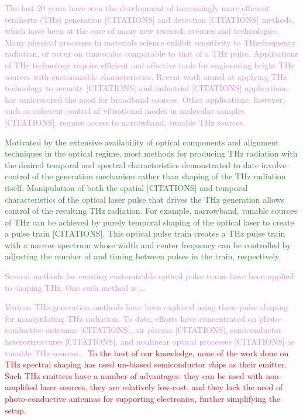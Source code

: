 \documentclass[12pt]{article}
\begin{document}
\begin{em}
  \textcolor{violet}{The last 20 years have seen the development of
    increasingly more efficient terahertz (THz) generation [CITATIONS]
    and detection [CITATIONS] methods, which have been at the core of
    many new research avenues and technologies. Many physical
    processes in materials science exhibit sensitivity to
    THz-frequency radiation, or occur on timescales comparable to that
    of a THz pulse. Applications of THz technology require efficient
    and effective tools for engineering bright THz sources with
    customizable characteristics. Recent work aimed at applying THz
    technology to security [CITATIONS] and industrial [CITATIONS]
    applications has underscored the need for broadband sources. Other
    applications, however, such as coherent control of vibrational
    modes in molecular samples [CITATIONS], require access to
    narrowband, tunable THz sources.}

  \textcolor{ForestGreen}{Motivated by the extensive availability of
    optical components and alignment techniques in the optical regime,
    most methods for producing THz radiation with the desired temporal
    and spectral characteristics demonstrated to date involve control
    of the generation mechanism rather than shaping of the THz
    radiation itself. Manipulation of both the spatial [CITATIONS] and
    temporal characteristics of the optical laser pulse that drives
    the THz generation allows control of the resulting THz
    radiation. For example, narrowband, tunable sources of THz can be
    achieved by purely temporal shaping of the optical laser to create
    a pulse train [CITATIONS]. This optical pulse train creates a THz
    pulse train with a narrow spectrum whose width and center
    frequency can be controlled by adjusting the number of and timing
    between pulses in the train, respectively.}

  \textcolor{violet}{Several methods for creating customizable optical
    pulse trains have been applied to shaping THz. One such method is
    ...}

  \textcolor{violet}{Various THz generation methods have been explored
    using these pulse shaping for manipulating THz radiation. To date,
    efforts have concentrated on photo-conductive antennas
    [CITATIONS], air plasma [CITATIONS], semiconductor
    heterostructures [CITATIONS], and nonlinear optical processes
    [CITATIONS] as tunable THz sources...} \textcolor{red}{To the best
    of our knowledge, none of the work done on THz spectral shaping
    has used un-biased semiconductor chips as their emitter. Such THz
    emitters have a number of advantages: they can be used with
    non-amplified laser sources, they are relatively low-cost, and
    they lack the need of photo-conductive antennas for supporting
    electronics, further simplifying the setup.}


\end{em}
\end{document}
